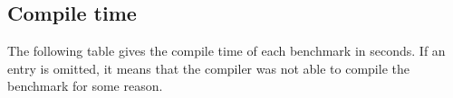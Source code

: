 \begin{center}
\begin{tabular}{lrrr}
\end{tabular}
\end{center}

\subsection{Compile time}

The following table gives the compile time of each benchmark in
seconds.
If an entry is omitted, it means that the compiler was not able to
compile the benchmark for some reason.

